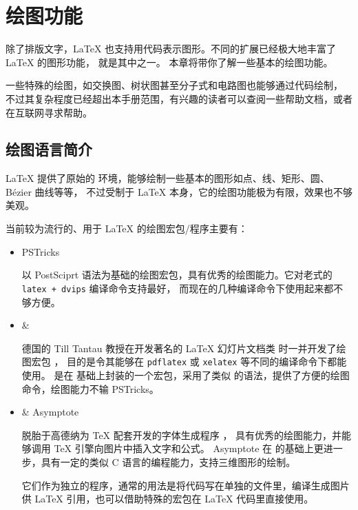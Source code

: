 \chapter{绘图功能}\label{chap:graphics}

\begin{intro}
除了排版文字，\LaTeX{} 也支持用代码表示图形。不同的扩展已经极大地丰富了 \LaTeX{} 的图形功能， 就是其中之一。
本章将带你了解一些基本的绘图功能。

一些特殊的绘图，如交换图、树状图甚至分子式和电路图也能够通过代码绘制，
不过其复杂程度已经超出本手册范围，有兴趣的读者可以查阅一些帮助文档，或者在互联网寻求帮助。
\end{intro}

\section{绘图语言简介}\label{sec:pict-lang}

\LaTeX{} 提供了原始的  环境，能够绘制一些基本的图形如点、线、矩形、圆、B\'ezier 曲线等等，
不过受制于 \LaTeX{} 本身，它的绘图功能极为有限，效果也不够美观。

当前较为流行的、用于 \LaTeX{} 的绘图宏包/程序主要有：
\begin{itemize}
  \item PSTricks \par
  以 PostSciprt 语法为基础的绘图宏包，具有优秀的绘图能力。它对老式的 \texttt{latex + dvips} 编译命令支持最好，
  而现在的几种编译命令下使用起来都不够方便。

  \item {} \&  \par
  德国的 Till Tantau 教授在开发著名的 \LaTeX{} 幻灯片文档类  时一并开发了绘图宏包 ，
  目的是令其能够在 \texttt{pdflatex} 或 \texttt{xelatex} 等不同的编译命令下都能使用。
   是在  基础上封装的一个宏包，采用了类似  的语法，提供了方便的绘图命令，绘图能力不输 PSTricks。

  \item {} \& Asymptote \par
   脱胎于高德纳为 \TeX{} 配套开发的字体生成程序 ，
  具有优秀的绘图能力，并能够调用 \TeX{} 引擎向图片中插入文字和公式。
  Asymptote 在  的基础上更进一步，具有一定的类似 C 语言的编程能力，支持三维图形的绘制。\par
  它们作为独立的程序，通常的用法是将代码写在单独的文件里，编译生成图片供 \LaTeX{} 引用，也可以借助特殊的宏包在 \LaTeX{} 代码里直接使用。
\end{itemize}

